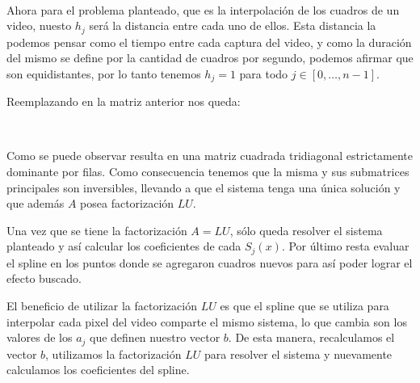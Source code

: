 ~

Ahora para el problema planteado, que es la interpolación de los cuadros de un
video, nuesto $h_j$ será la distancia entre cada uno de ellos. Esta distancia la
podemos pensar como el tiempo entre cada captura del video, y como la duración
del mismo se define por la cantidad de cuadros por segundo, podemos afirmar que
son equidistantes, por lo tanto tenemos $h_j = 1$ para todo $j \in [0, \dots,
n-1]$.

Reemplazando en la matriz anterior nos queda:

\setlength{\arraycolsep}{6pt}

~

Como se puede observar resulta en una matriz cuadrada tridiagonal estrictamente dominante
por filas. Como consecuencia tenemos que la misma y sus submatrices principales
son inversibles, llevando a que el sistema tenga una única solución y que además
$A$ posea factorización $LU$.

Una vez que se tiene la factorización $A = LU$, sólo queda resolver el sistema
planteado y así calcular los coeficientes de cada $S_j(x)$. Por último resta
evaluar el spline en los puntos donde se agregaron cuadros nuevos para así poder
lograr el efecto buscado.

El beneficio de utilizar la factorización $LU$ es que el spline que se utiliza
para interpolar cada pixel del video comparte el mismo sistema, lo que cambia
son los valores de los $a_j$ que definen nuestro vector $b$. De esta manera,
recalculamos el vector $b$, utilizamos la factorización $LU$ para resolver el
sistema y nuevamente calculamos los coeficientes del spline.

